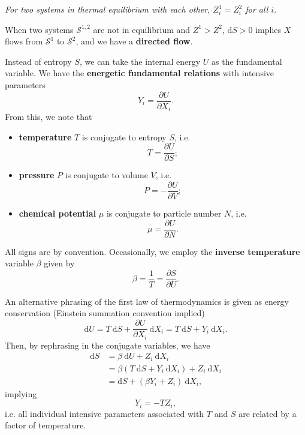 \documentclass[letter-paper]{tufte-book}
\newenvironment{example}[1][Example]{\begin{trivlist}
\item[\hskip \labelsep {\bfseries #1}]}{\end{trivlist}}
\newcommand\Def[1]{\textbf{#1}}
\begin{document}
\begin{center}\textit{For two systems in thermal equilibrium with each other,
$Z^1_i = Z^2_i$ for all $i$.}\end{center}

When two systems $\mathcal{S}^{1,2}$ are not in equilibrium and $Z^1 > Z^2$,
$\mathrm{d}S > 0$ implies $X$ flows from $\mathcal{S}^1$ to $\mathcal{S}^2$, and
we have a \Def{directed flow}.

Instead of entropy $S$, we can take the internal energy $U$ as the fundamental
variable. We have the \Def{energetic fundamental
relations} with intensive parameters
\begin{equation}
  Y_i = \frac{\partial U}{\partial X_i}.
\end{equation}
From this, we note that
\begin{itemize}
  \item \Def{temperature} $T$ is conjugate to entropy $S$, i.e.
  \begin{equation}
    T = \frac{\partial U}{\partial S};
  \end{equation}
  \item \Def{pressure} $P$ is conjugate to volume $V$, i.e.
  \begin{equation}
    P = -\frac{\partial U}{\partial V};
  \end{equation}
  \item \Def{chemical potential} $\mu$ is conjugate to particle number $N$, i.e.
  \begin{equation}
    \mu = \frac{\partial U}{\partial N}.
  \end{equation}
\end{itemize}
All signs are by convention. Occasionally, we employ the \Def{inverse
temperature} variable $\beta$ given by
\begin{equation}
  \beta = \frac{1}{T} = \frac{\partial S}{\partial U}.
\end{equation}

\begin{example}
An alternative phrasing of the first law of thermodynamics is given as energy conservation
(Einstein summation convention implied)
\begin{equation}
  \mathrm{d}U = T\ \mathrm{d}S + \frac{\partial U}{\partial X_i}\ \mathrm{d}X_i = T\ \mathrm{d}S + Y_i\ \mathrm{d}X_i.
\end{equation}
Then, by rephrasing in the conjugate variables, we have
\begin{align*}
  \mathrm{d}S &= \beta\ \mathrm{d}U + Z_i\ \mathrm{d}X_i \\
    &= \beta(T\ \mathrm{d}S + Y_i\ \mathrm{d}X_i) + Z_i\ \mathrm{d}X_i \\
    &= \mathrm{d}S + (\beta Y_i + Z_i)\ \mathrm{d}X_i,
\end{align*}
implying
\begin{equation}
  Y_i = -T Z_i,
\end{equation}
i.e. all individual intensive parameters associated with $T$ and $S$ are related
by a factor of temperature.
\end{example}
\end{document}
